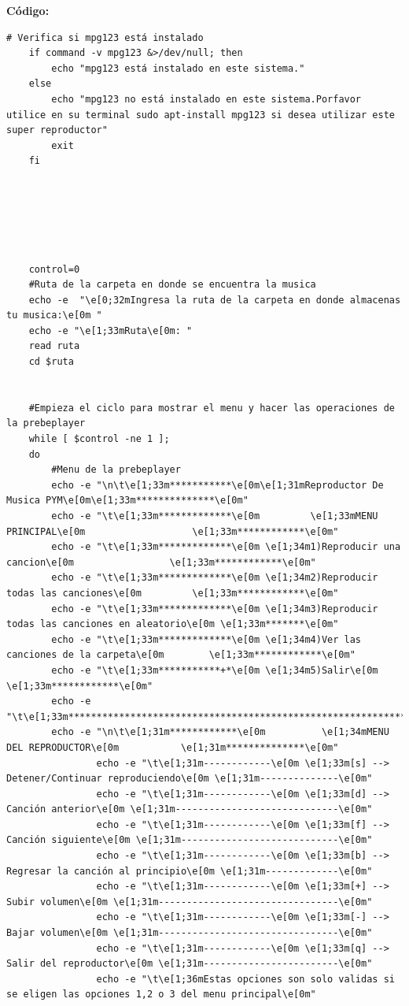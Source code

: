 \documentclass[12pt,a4paper]{article}
\begin{document}
\newpage
\textbf{Código:}
\begin{lstlisting}[style=BashInputStyle]
# Verifica si mpg123 está instalado
	if command -v mpg123 &>/dev/null; then
	    echo "mpg123 está instalado en este sistema."
	else
	    echo "mpg123 no está instalado en este sistema.Porfavor utilice en su terminal sudo apt-install mpg123 si desea utilizar este super reproductor"
	    exit
	fi
	
	
	


	
	control=0
	#Ruta de la carpeta en donde se encuentra la musica
	echo -e  "\e[0;32mIngresa la ruta de la carpeta en donde almacenas tu musica:\e[0m "
	echo -e "\e[1;33mRuta\e[0m: "
	read ruta
	cd $ruta


	#Empieza el ciclo para mostrar el menu y hacer las operaciones de la prebeplayer
	while [ $control -ne 1 ];
	do
		#Menu de la prebeplayer
		echo -e "\n\t\e[1;33m***********\e[0m\e[1;31mReproductor De Musica PYM\e[0m\e[1;33m**************\e[0m"
		echo -e "\t\e[1;33m*************\e[0m         \e[1;33mMENU PRINCIPAL\e[0m                   \e[1;33m************\e[0m"
		echo -e "\t\e[1;33m*************\e[0m \e[1;34m1)Reproducir una cancion\e[0m                 \e[1;33m************\e[0m"
		echo -e "\t\e[1;33m*************\e[0m \e[1;34m2)Reproducir todas las canciones\e[0m         \e[1;33m************\e[0m"
		echo -e "\t\e[1;33m*************\e[0m \e[1;34m3)Reproducir todas las canciones en aleatorio\e[0m \e[1;33m*******\e[0m"
		echo -e "\t\e[1;33m*************\e[0m \e[1;34m4)Ver las canciones de la carpeta\e[0m        \e[1;33m************\e[0m"
		echo -e "\t\e[1;33m***********+*\e[0m \e[1;34m5)Salir\e[0m                                  \e[1;33m************\e[0m"
		echo -e "\t\e[1;33m*******************************************************************\e[0m"
		echo -e "\n\t\e[1;31m************\e[0m          \e[1;34mMENU DEL REPRODUCTOR\e[0m           \e[1;31m**************\e[0m"
                echo -e "\t\e[1;31m------------\e[0m \e[1;33m[s] --> Detener/Continuar reproduciendo\e[0m \e[1;31m--------------\e[0m"
                echo -e "\t\e[1;31m------------\e[0m \e[1;33m[d] --> Canción anterior\e[0m \e[1;31m-----------------------------\e[0m"
                echo -e "\t\e[1;31m------------\e[0m \e[1;33m[f] --> Canción siguiente\e[0m \e[1;31m----------------------------\e[0m"
                echo -e "\t\e[1;31m------------\e[0m \e[1;33m[b] --> Regresar la canción al principio\e[0m \e[1;31m-------------\e[0m"
                echo -e "\t\e[1;31m------------\e[0m \e[1;33m[+] --> Subir volumen\e[0m \e[1;31m--------------------------------\e[0m"
                echo -e "\t\e[1;31m------------\e[0m \e[1;33m[-] --> Bajar volumen\e[0m \e[1;31m--------------------------------\e[0m"
                echo -e "\t\e[1;31m------------\e[0m \e[1;33m[q] --> Salir del reproductor\e[0m \e[1;31m------------------------\e[0m"
                echo -e "\t\e[1;36mEstas opciones son solo validas si se eligen las opciones 1,2 o 3 del menu principal\e[0m"


\end{lstlisting}
\end{document}
